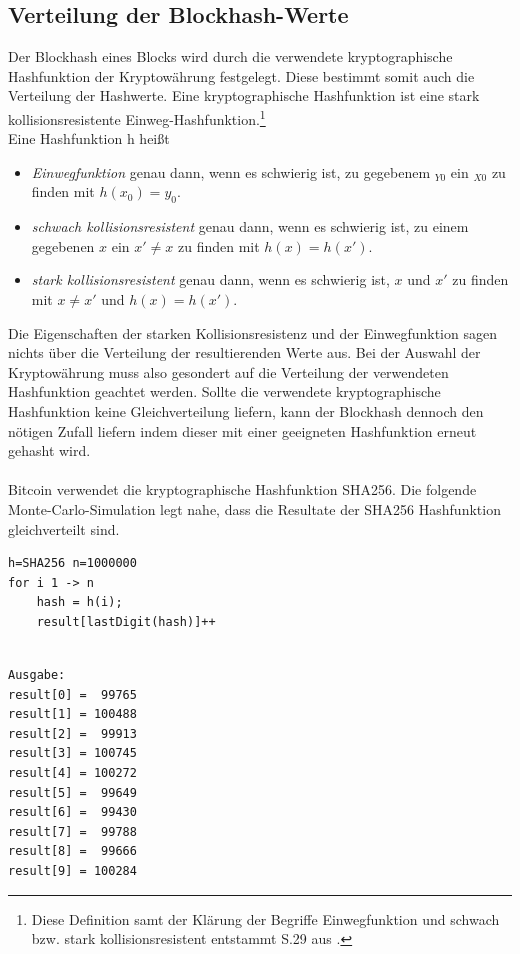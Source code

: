 \subsection{Verteilung der Blockhash-Werte}\label{btc_distribution}
Der Blockhash eines Blocks wird durch die verwendete kryptographische Hashfunktion der Kryptowährung festgelegt. Diese bestimmt somit auch die Verteilung der Hashwerte. Eine kryptographische Hashfunktion ist eine stark kollisionsresistente Einweg-Hashfunktion.\footnote{Diese Definition samt der Klärung der Begriffe Einwegfunktion und schwach bzw. stark kollisionsresistent entstammt S.29 aus \cite{kryptologie}.}\\
Eine Hashfunktion h heißt
\begin{itemize}
\item \textit{Einwegfunktion} genau dann, wenn es schwierig ist, zu gegebenem $_{Y0}$ ein $_{X0}$ zu finden mit $h(x_{0}) = y_{0}$.
\item \textit{schwach kollisionsresistent} genau dann, wenn es schwierig ist, zu einem gegebenen $x$ ein $x' \neq x$ zu finden mit $h(x) = h(x')$.
\item \emph{stark kollisionsresistent} genau dann, wenn es schwierig ist, $x$ und $x'$ zu finden
mit $x \neq x'$ und $h(x) = h(x')$.
\end{itemize}Die Eigenschaften der starken Kollisionsresistenz und der Einwegfunktion sagen nichts über die Verteilung der resultierenden Werte aus. Bei der Auswahl der Kryptowährung muss also gesondert auf die Verteilung der verwendeten Hashfunktion geachtet werden. Sollte die verwendete kryptographische Hashfunktion keine Gleichverteilung liefern, kann der Blockhash dennoch den nötigen Zufall liefern indem dieser mit einer geeigneten Hashfunktion erneut gehasht wird.\\\\
Bitcoin verwendet die kryptographische Hashfunktion SHA256.
Die folgende Monte-Carlo-Simulation legt nahe, dass die Resultate der SHA256 Hashfunktion gleichverteilt sind.
\begin{verbatim}
h=SHA256 n=1000000
for i 1 -> n
    hash = h(i);
    result[lastDigit(hash)]++


\end{verbatim}
\begin{minipage}{0.5\textwidth}
\begin{verbatim}
Ausgabe:
result[0] =  99765
result[1] = 100488
result[2] =  99913
result[3] = 100745
result[4] = 100272
result[5] =  99649
result[6] =  99430
result[7] =  99788
result[8] =  99666
result[9] = 100284
\end{verbatim}
\end{minipage}
